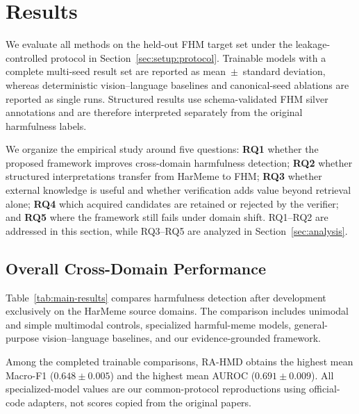 \section{Results}
\label{sec:results}

We evaluate all methods on the held-out FHM target set under the
leakage-controlled protocol in Section~\ref{sec:setup:protocol}.
Trainable models with a complete multi-seed result set are reported as
mean~$\pm$~standard deviation, whereas deterministic vision--language
baselines and canonical-seed ablations are reported as single runs.
Structured results use schema-validated FHM silver annotations and are
therefore interpreted separately from the original harmfulness labels.

We organize the empirical study around five questions:
\textbf{RQ1} whether the proposed framework improves cross-domain
harmfulness detection;
\textbf{RQ2} whether structured interpretations transfer from HarMeme to
FHM;
\textbf{RQ3} whether external knowledge is useful and whether verification
adds value beyond retrieval alone;
\textbf{RQ4} which acquired candidates are retained or rejected by the
verifier; and
\textbf{RQ5} where the framework still fails under domain shift.
RQ1--RQ2 are addressed in this section, while RQ3--RQ5 are analyzed in
Section~\ref{sec:analysis}.

\subsection{Overall Cross-Domain Performance}
\label{sec:results:harmfulness}

Table~\ref{tab:main-results} compares harmfulness detection after
development exclusively on the HarMeme source domains.
The comparison includes unimodal and simple multimodal controls,
specialized harmful-meme models, general-purpose vision--language
baselines, and our evidence-grounded framework.

\begin{table}[t]
    \caption{
    Held-out FHM harmfulness detection under the locked
    HarMeme-to-FHM protocol.
    Multi-seed trainable methods are reported as mean~$\pm$~standard
    deviation; deterministic inference-only conditions are reported as
    single runs.
    }
    \label{tab:main-results}
    \centering
    \renewcommand{\arraystretch}{1.18}
    
\end{table}

Among the completed trainable comparisons, RA-HMD obtains the highest mean Macro-F1
($0.648\pm0.005$) and the highest mean AUROC ($0.691\pm0.009$).
All specialized-model values are our common-protocol reproductions using
official-code adapters, not scores copied from the original papers.

